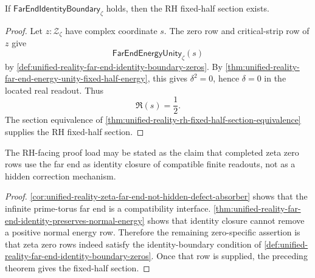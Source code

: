 \begin{theorem}
\label{thm:unified-reality-far-end-identity-boundary-conditionally-sufficient}
If $\mathsf{FarEndIdentityBoundary}_{\zeta}$ holds, then the RH
fixed-half section exists.
\end{theorem}

\begin{proof}
Let $z:\mathcal Z_{\zeta}$ have complex coordinate $s$.  The zero row and
critical-strip row of $z$ give
$$
\mathsf{FarEndEnergyUnity}_{\zeta}(s)
$$
by
\autoref{def:unified-reality-far-end-identity-boundary-zeros}.  By
\autoref{thm:unified-reality-far-end-energy-unity-fixed-half-energy},
this gives $\delta^2=0$, hence $\delta=0$ in the located real readout.
Thus
$$
\Re(s)=\frac12.
$$
The section equivalence of
\autoref{thm:unified-reality-rh-fixed-half-section-equivalence} supplies
the RH fixed-half section.
\end{proof}

\begin{corollary}
\label{cor:unified-reality-proof-load-identity-closure-zero-rows}
The RH-facing proof load may be stated as the claim that completed zeta
zero rows use the far end as identity closure of compatible finite
readouts, not as a hidden correction mechanism.
\end{corollary}

\begin{proof}
\autoref{cor:unified-reality-zeta-far-end-not-hidden-defect-absorber}
shows that the infinite prime-torus far end is a compatibility interface.
\autoref{thm:unified-reality-far-end-identity-preserves-normal-energy}
shows that identity closure cannot remove a positive normal energy row.
Therefore the remaining zero-specific assertion is that zeta zero rows
indeed satisfy the identity-boundary condition of
\autoref{def:unified-reality-far-end-identity-boundary-zeros}.  Once that
row is supplied, the preceding theorem gives the fixed-half section.
\end{proof}
